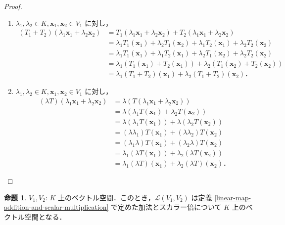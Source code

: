 \documentclass{jlreq}
\theoremstyle{definition}
\newtheorem{prop}[thm]{命題}
\begin{document}
      \begin{proof}
        \mbox{}
        \begin{enumerate}
          \item $\lambda_1,\lambda_2 \in K, \bm{x}_1,\bm{x}_2 \in V_1$ に対し，
            \begin{align*}
              (T_1+T_2)(\lambda_1\bm{x}_1+\lambda_2\bm{x}_2) &= T_1(\lambda_1\bm{x}_1+\lambda_2\bm{x}_2)+T_2(\lambda_1\bm{x}_1+\lambda_2\bm{x}_2) \\
              &= \lambda_1T_1(\bm{x}_1)+\lambda_2T_1(\bm{x}_2)+\lambda_1T_2(\bm{x}_1)+\lambda_2T_2(\bm{x}_2) \\
              &= \lambda_1T_1(\bm{x}_1)+\lambda_1T_2(\bm{x}_1)+\lambda_2T_1(\bm{x}_2)+\lambda_2T_2(\bm{x}_2) \\
              &= \lambda_1(T_1(\bm{x}_1)+T_2(\bm{x}_1))+\lambda_2(T_1(\bm{x}_2)+T_2(\bm{x}_2)) \\
              &= \lambda_1(T_1+T_2)(\bm{x}_1)+\lambda_2(T_1+T_2)(\bm{x}_2)．
            \end{align*}
          \item $\lambda_1,\lambda_2 \in K, \bm{x}_1,\bm{x}_2 \in V_1$ に対し，
            \begin{align*}
              (\lambda T)(\lambda_1\bm{x}_1+\lambda_2\bm{x}_2) &= \lambda(T(\lambda_1\bm{x}_1+\lambda_2\bm{x}_2)) \\
              &= \lambda(\lambda_1T(\bm{x}_1)+\lambda_2T(\bm{x}_2)) \\
              &= \lambda(\lambda_1T(\bm{x}_1))+\lambda(\lambda_2T(\bm{x}_2)) \\
              &= (\lambda\lambda_1)T(\bm{x}_1)+(\lambda\lambda_2)T(\bm{x}_2) \\
              &= (\lambda_1\lambda)T(\bm{x}_1)+(\lambda_2\lambda)T(\bm{x}_2) \\
              &= \lambda_1(\lambda T(\bm{x}_1))+\lambda_2(\lambda T(\bm{x}_2)) \\
              &= \lambda_1(\lambda T)(\bm{x}_1)+\lambda_2(\lambda T)(\bm{x}_2)．
            \end{align*}
        \end{enumerate}
      \end{proof}
      \begin{prop}
        $V_1,V_2$: $K$ 上のベクトル空間．このとき，$\mathcal{L}(V_1,V_2)$ は定義
         \ref{linear-map-addition-and-scalar-multiplication} で定めた加法とスカラー倍について $K$ 上のベクトル空間となる．
      \end{prop}
\end{document}
